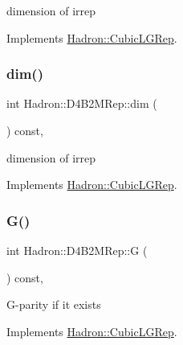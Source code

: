 dimension of irrep 

Implements \mbox{\hyperlink{structHadron_1_1CubicLGRep_a3acbaea26503ed64f20df693a48e4cdd}{Hadron\+::\+Cubic\+L\+G\+Rep}}.

\mbox{\label{structHadron_1_1D4B2MRep_ac21548568caf31696cb786877246f6a3}} 
\subsubsection{\texorpdfstring{dim()}{dim()}\hspace{0.1cm}{\footnotesize\ttfamily [2/2]}}
{\footnotesize\ttfamily int Hadron\+::\+D4\+B2\+M\+Rep\+::dim (\begin{DoxyParamCaption}{ }\end{DoxyParamCaption}) const\hspace{0.3cm}{\ttfamily [inline]}, {\ttfamily [virtual]}}

dimension of irrep 

Implements \mbox{\hyperlink{structHadron_1_1CubicLGRep_a3acbaea26503ed64f20df693a48e4cdd}{Hadron\+::\+Cubic\+L\+G\+Rep}}.

\mbox{\label{structHadron_1_1D4B2MRep_a144db6312f6d067b35490405af2f5873}} 
\subsubsection{\texorpdfstring{G()}{G()}\hspace{0.1cm}{\footnotesize\ttfamily [1/2]}}
{\footnotesize\ttfamily int Hadron\+::\+D4\+B2\+M\+Rep\+::G (\begin{DoxyParamCaption}{ }\end{DoxyParamCaption}) const\hspace{0.3cm}{\ttfamily [inline]}, {\ttfamily [virtual]}}

G-\/parity if it exists 

Implements \mbox{\hyperlink{structHadron_1_1CubicLGRep_ace26f7b2d55e3a668a14cb9026da5231}{Hadron\+::\+Cubic\+L\+G\+Rep}}.

\mbox{\label{structHadron_1_1D4B2MRep_a144db6312f6d067b35490405af2f5873}} 
